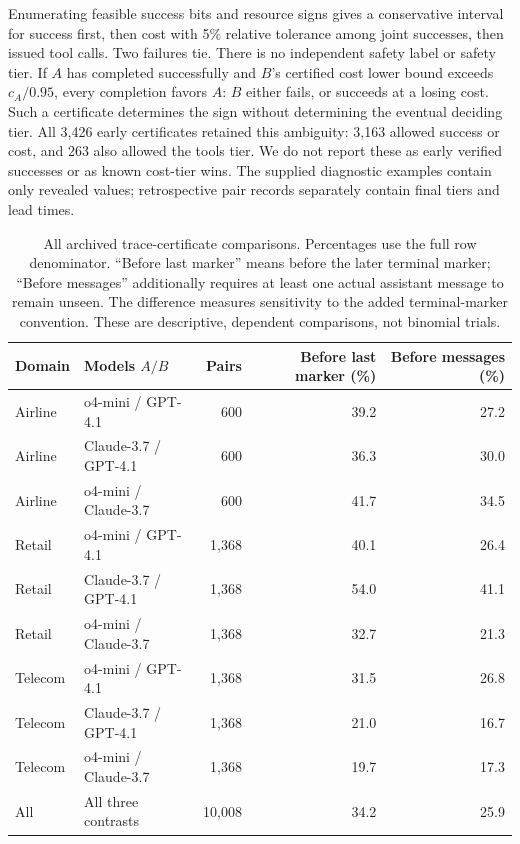 Enumerating feasible success bits and resource signs gives a conservative
interval for success first, then cost with 5\% relative tolerance among
joint successes, then issued tool calls. Two failures tie. There is no
independent safety label or safety tier. If $A$ has completed successfully
and $B$'s certified cost lower bound exceeds $c_A/0.95$, every
completion favors $A$: $B$ either fails, or succeeds at a losing cost.
Such a certificate determines the sign without determining the eventual
deciding tier. All 3,426 early certificates retained this ambiguity:
3,163 allowed success or cost, and 263 also allowed the tools tier.
We do not report these as early verified successes or as known cost-tier
wins. The supplied diagnostic examples contain only revealed values;
retrospective pair records separately contain final tiers and lead times.

\begin{table}[t]
\centering\small
\caption{All archived trace-certificate comparisons. Percentages use
the full row denominator. ``Before last marker'' means before the later terminal
marker; ``Before messages'' additionally requires at least one actual
assistant message to remain unseen. The difference measures sensitivity
to the added terminal-marker convention. These are descriptive,
dependent comparisons, not binomial trials.}
\label{tab:trace_certificates}
\begin{tabular}{llrrr}
\toprule
Domain & Models $A/B$ & Pairs & Before last marker (\%) & Before messages (\%)\\
\midrule
Airline & o4-mini / GPT-4.1 & 600 & 39.2 & 27.2 \\
Airline & Claude-3.7 / GPT-4.1 & 600 & 36.3 & 30.0 \\
Airline & o4-mini / Claude-3.7 & 600 & 41.7 & 34.5 \\
Retail & o4-mini / GPT-4.1 & 1,368 & 40.1 & 26.4 \\
Retail & Claude-3.7 / GPT-4.1 & 1,368 & 54.0 & 41.1 \\
Retail & o4-mini / Claude-3.7 & 1,368 & 32.7 & 21.3 \\
Telecom & o4-mini / GPT-4.1 & 1,368 & 31.5 & 26.8 \\
Telecom & Claude-3.7 / GPT-4.1 & 1,368 & 21.0 & 16.7 \\
Telecom & o4-mini / Claude-3.7 & 1,368 & 19.7 & 17.3 \\
\midrule
All & All three contrasts & 10,008 & 34.2 & 25.9 \\
\bottomrule
\end{tabular}
\end{table}

